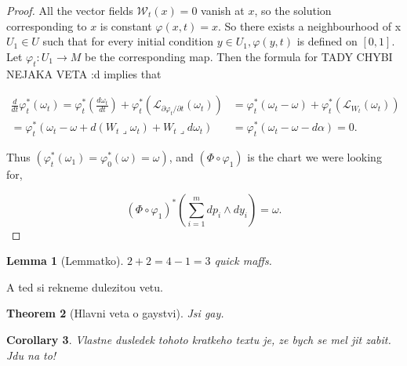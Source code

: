 \documentclass{article}
\newtheorem{theorem}{Theorem}
\newtheorem{lemma}[theorem]{Lemma} %
\newtheorem{corollary}[theorem]{Corollary}
\theoremstyle{definition}
\begin{document}
\begin{proof}
    All the vector fields $\mathcal{W}_t(x) = 0$ vanish at $x$, so the solution corresponding to $x$ is constant $\varphi(x,t) = x$. So there exists a neighbourhood of x $U_1 \in U$ such that for every initial condition $y \in U_1, \varphi(y,t)$ is defined on $[0,1]$. Let $\varphi_t:U_1 \rightarrow M$ be the corresponding map. Then the formula for 
    TADY CHYBI NEJAKA VETA :d
    implies that 



    \begin{equation*}
        \begin{split}
            \frac{d}{dt} \varphi_t^* (\omega_t) = \varphi_t^* \left( \frac{d\omega_t}{dt} \right) 
            + \varphi_t^* \left( \mathcal{L}_{\partial \varphi_t / \partial t} (\omega_t) \right)
            &= \varphi_t^* (\omega_t - \omega) + \varphi_t^* \left( \mathcal{L}_{W_t} (\omega_t) \right) \\ 
            = \varphi_t^* (\omega_t - \omega + d(W_t \lrcorner \omega_t) + W_t \lrcorner d\omega_t) 
            &= \varphi_t^* (\omega_t - \omega - d\alpha) = 0.
        \end{split}
    \end{equation*}



    Thus $(\varphi_t^*(\omega_1) = \varphi_0^*(\omega) = \omega)$, and $(\Phi \circ \varphi_1)$ is the chart we were looking for,

    \begin{equation*}
        (\Phi \circ \varphi_1)^* \left( \sum_{i=1}^m dp_i \wedge dy_i \right) = \omega.
    \end{equation*}

\end{proof}

\begin{lemma}[Lemmatko]
$2+2 = 4 - 1 = 3$ quick maffs.
\end{lemma}

A ted si rekneme dulezitou vetu.
\begin{theorem}[Hlavni veta o gaystvi]
Jsi gay.
\end{theorem}


\begin{corollary}
    Vlastne dusledek tohoto kratkeho textu je, ze bych se mel jit zabit. Jdu na to!
\end{corollary}
\end{document}
